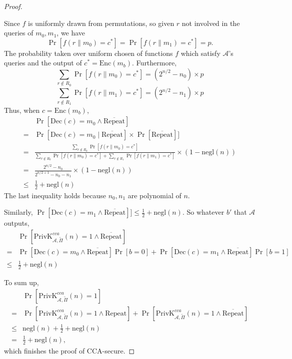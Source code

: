 \documentclass[12pt]{article}
\newcommand{\privk}{\text{PrivK}}
\newcommand{\negl}{\text{negl}}
\newcommand{\Enc}{\text{Enc}}
\newcommand{\Dec}{\text{Dec}}
\newcommand{\Repeat}{\text{Repeat}}
\newcommand{\A}{\mathcal{A}}
\newenvironment{problem}[2][Problem]{\begin{trivlist}
\item[\hskip \labelsep {\bfseries #1}\hskip \labelsep {\bfseries #2.}]}{\end{trivlist}}
\begin{document}
\begin{problem}{4.25}
\begin{proof}
\begin{enumerate}
    Since $f$ is uniformly drawn from permutations, so given $r$ not involved in the queries of $m_0,m_1$, we have $$\Pr[f(r\|m_0)=c^*] = \Pr[f(r\|m_1)=c^*] = p.$$
    The probability taken over uniform chosen of functions $f$ which satisfy $\A$'s queries and the output of $c^*=\Enc(m_b)$.
    Furthermore, $$\sum_{r\not\in R_0}\Pr[f(r\|m_0)=c^*] = (2^{n/2}-n_0)\times p$$
    $$\sum_{r\not\in R_1}\Pr[f(r\|m_1)=c^*] = (2^{n/2}-n_1)\times p$$
    Thus, when $c=\Enc(m_b)$, 
    \begin{align*}
        &\Pr[\Dec(c)=m_0\land\overline{\Repeat}]\\
        =&\Pr[\Dec(c)=m_0\mid\overline{\Repeat}]\times\Pr[\overline{\Repeat}]]\\
        =&\frac{\sum_{r\not\in R_0}\Pr[f(r\|m_0)=c^*]}{\sum_{r\not\in R_0}\Pr[f(r\|m_0)=c^*]+\sum_{r\not\in R_1}\Pr[f(r\|m_1)=c^*]}\times(1-\negl(n))\\
        =&\frac{2^{n/2}-n_0}{2^{n/2+1}-n_0-n_1}\times(1-\negl(n))\\
        \le&\frac12 +\negl(n)
    \end{align*}
    The last inequality holds because $n_0,n_1$ are polynomial of $n$. \par
    Similarly, $\Pr[\Dec(c)=m_1\land\overline{\Repeat}]]\le\frac12 +\negl(n)$. So whatever $b'$ that $\A$ outputs, \begin{align*}
        &\Pr[\privk_{\A,\widetilde{\Pi}}^{cca}(n)=1\land\overline{\Repeat}]\\
        =&\Pr[\Dec(c)=m_0\land\overline{\Repeat}]\Pr[b=0]+\Pr[\Dec(c)=m_1\land\overline{\Repeat}]\Pr[b=1]\\
        \le&\frac12 +\negl(n)
    \end{align*}
\end{enumerate}
\par\vspace{2ex}
To sum up, \begin{align*}
    &\Pr[\privk_{\A,\widetilde{\Pi}}^{cca}(n)=1]\\
    =&\Pr[\privk_{\A,\widetilde{\Pi}}^{cca}(n)=1\land\Repeat]+\Pr[\privk_{\A,\widetilde{\Pi}}^{cca}(n)=1\land\overline{\Repeat}]\\
    \le&\negl(n)+\frac12 +\negl(n)\\
    =&\frac12 +\negl(n),
\end{align*}
which finishes the proof of CCA-secure.
\end{proof}
\end{problem}
\end{document}
